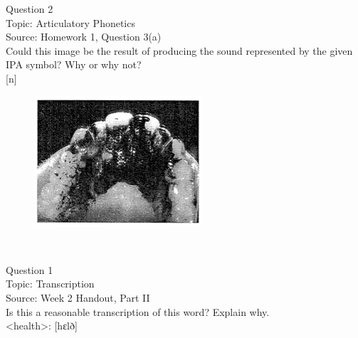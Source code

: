 \documentclass[12pt]{article}
\begin{document}
\newpage

{\large Question 2}\\

Topic: Articulatory Phonetics\\
Source: Homework 1, Question 3(a)\\

Could this image be the result of producing the sound represented by the given IPA symbol? Why or why not?\\

{[n]}

\begin{figure}[H]
\includegraphics{../images/staticpalatography_stop.png}
\end{figure}

\newpage

\begin{center}
\textbf{{\color{red}{\HUGE END OF EXAM}}}\\

\end{center}
\newpage

\begin{center}
\textbf{{\color{blue}{\HUGE START OF EXAM\\}}}

\textbf{{\color{blue}{\HUGE Student ID: 50775\\}}}

\textbf{{\color{blue}{\HUGE 4:50\\}}}

\end{center}
\newpage

{\large Question 1}\\

Topic: Transcription\\
Source: Week 2 Handout, Part II\\

Is this a reasonable transcription of this word? Explain why.\\

<health>: {[hɛlð]}
\end{document}
